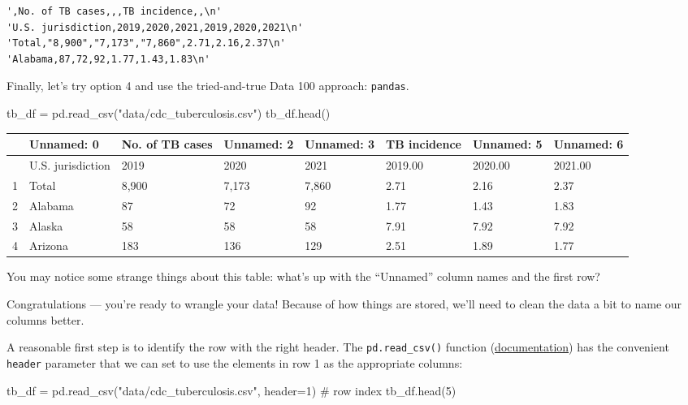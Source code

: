 \documentclass[
  letterpaper,
  DIV=11,
  numbers=noendperiod]{scrreprt}
\newenvironment{Shaded}{\begin{snugshade}}{\end{snugshade}}
\newcommand{\CommentTok}[1]{\textcolor[rgb]{0.37,0.37,0.37}{#1}}
\newcommand{\DecValTok}[1]{\textcolor[rgb]{0.68,0.00,0.00}{#1}}
\newcommand{\NormalTok}[1]{\textcolor[rgb]{0.00,0.23,0.31}{#1}}
\newcommand{\OperatorTok}[1]{\textcolor[rgb]{0.37,0.37,0.37}{#1}}
\newcommand{\StringTok}[1]{\textcolor[rgb]{0.13,0.47,0.30}{#1}}
\begin{document}
\begin{verbatim}
',No. of TB cases,,,TB incidence,,\n'
'U.S. jurisdiction,2019,2020,2021,2019,2020,2021\n'
'Total,"8,900","7,173","7,860",2.71,2.16,2.37\n'
'Alabama,87,72,92,1.77,1.43,1.83\n'
\end{verbatim}

Finally, let's try option 4 and use the tried-and-true Data 100
approach: \texttt{pandas}.

\begin{Shaded}
\begin{Highlighting}[]
\NormalTok{tb\_df }\OperatorTok{=}\NormalTok{ pd.read\_csv(}\StringTok{"data/cdc\_tuberculosis.csv"}\NormalTok{)}
\NormalTok{tb\_df.head()}
\end{Highlighting}
\end{Shaded}

\begin{longtable}[]{@{}llllllll@{}}
\toprule\noalign{}
& Unnamed: 0 & No. of TB cases & Unnamed: 2 & Unnamed: 3 & TB incidence
& Unnamed: 5 & Unnamed: 6 \\
\midrule\noalign{}
\endhead
\bottomrule\noalign{}
\endlastfoot
0 & U.S. jurisdiction & 2019 & 2020 & 2021 & 2019.00 & 2020.00 &
2021.00 \\
1 & Total & 8,900 & 7,173 & 7,860 & 2.71 & 2.16 & 2.37 \\
2 & Alabama & 87 & 72 & 92 & 1.77 & 1.43 & 1.83 \\
3 & Alaska & 58 & 58 & 58 & 7.91 & 7.92 & 7.92 \\
4 & Arizona & 183 & 136 & 129 & 2.51 & 1.89 & 1.77 \\
\end{longtable}

You may notice some strange things about this table: what's up with the
``Unnamed'' column names and the first row?

Congratulations --- you're ready to wrangle your data! Because of how
things are stored, we'll need to clean the data a bit to name our
columns better.

A reasonable first step is to identify the row with the right header.
The \texttt{pd.read\_csv()} function
(\href{https://pandas.pydata.org/docs/reference/api/pandas.read_csv.html}{documentation})
has the convenient \texttt{header} parameter that we can set to use the
elements in row 1 as the appropriate columns:

\begin{Shaded}
\begin{Highlighting}[]
\NormalTok{tb\_df }\OperatorTok{=}\NormalTok{ pd.read\_csv(}\StringTok{"data/cdc\_tuberculosis.csv"}\NormalTok{, header}\OperatorTok{=}\DecValTok{1}\NormalTok{) }\CommentTok{\# row index}
\NormalTok{tb\_df.head(}\DecValTok{5}\NormalTok{)}
\end{Highlighting}
\end{Shaded}
\end{document}
